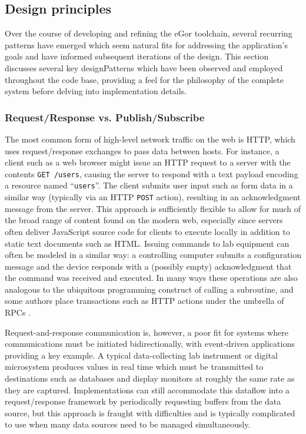 \documentclass[../thesis]{subfiles}
\begin{document}
\subsection{Design principles}
Over the course of developing and refining the eGor toolchain, several
recurring patterns have emerged which seem natural fits for addressing
the application's goals and have informed subsequent iterations of the
design. This section discusses several key \glspl{designPattern} which have
been observed and employed throughout the code base, providing a feel
for the philosophy of the complete system before delving into
implementation details.

\subsubsection{Request/Response vs. Publish/Subscribe}
The most common form of high-level network traffic on the web is HTTP,
which uses request/response exchanges to pass data between hosts. For
instance, a client such as a web browser might issue an HTTP request
to a server with the contents \texttt{GET /users}, causing the server
to respond with a text payload encoding a resource named
``\texttt{users}''. The client submits user input such as form data in
a similar way (typically via an HTTP \texttt{POST} action), resulting
in an acknowledgment message from the server. This approach is
sufficiently flexible to allow for much of the broad range of content
found on the modern web, especially since servers often deliver
JavaScript source code for clients to execute locally in addition to
static text documents such as HTML. Issuing commands to lab equipment
can often be modeled in a similar way: a controlling computer submits
a configuration message and the device responds with a (possibly
empty) acknowledgment that the command was received and executed.  In
many ways these operations are also analogous to the ubiquitous
programming construct of calling a subroutine, and some authors place
transactions such as HTTP actions under the umbrella of \glspl{RPC}
\cite{DBLP:journals/corr/abs-0911-4395}.

Request-and-response communication is, however, a poor fit for systems
where communications must be initiated bidirectionally, with
event-driven applications providing a key example. A typical
data-collecting lab instrument or digital microsystem produces values
in real time which must be transmitted to destinations such as
databases and display monitors at roughly the same rate as they are
captured. Implementations can still accommodate this dataflow into a
request/response framework by periodically requesting buffers from the
data source, but this approach is fraught with difficulties and is
typically complicated to use when many data sources need to be managed
simultaneously.
\end{document}

